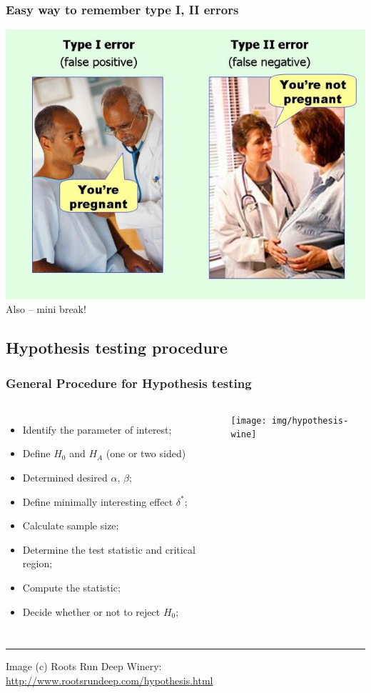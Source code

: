 \documentclass[10pt]{beamer}
\begin{document}
\begin{frame}
  \frametitle{Easy way to remember type I, II errors}
  \begin{center}
    \includegraphics[width=.8\textwidth]{img/type_I_type_II_errors}\\
    Also -- mini break!
  \end{center}
\end{frame}



\subsection{Hypothesis testing procedure}
\begin{frame}
  \frametitle{General Procedure for Hypothesis testing}
  \begin{columns}
    \begin{itemize}
    \item Identify the parameter of interest;
    \item Define $H_0$ and $H_A$ (one or two sided)
    \item Determined desired $\alpha$, $\beta$;
    \item Define minimally interesting effect $\delta^*$;
    \item Calculate sample size;
    \item Determine the test statistic and critical region;
    \item Compute the statistic;
    \item Decide whether or not to reject $H_0$;
    \end{itemize}
    \texttt{[image: img/hypothesis-wine]}
  \end{columns}
  \rule{1\textwidth}{0.4pt}
  {\tiny Image (c) Roots Run Deep Winery: \url{http://www.rootsrundeep.com/hypothesis.html}}
\end{frame}
\end{document}
